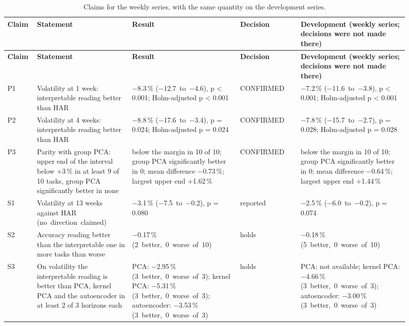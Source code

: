 {\scriptsize\setlength{\tabcolsep}{4pt}\renewcommand{\arraystretch}{1.2}
\begin{longtable}{@{}>{\raggedright\arraybackslash}p{0.069\linewidth}>{\raggedright\arraybackslash}p{0.226\linewidth}>{\raggedright\arraybackslash}p{0.254\linewidth}>{\raggedright\arraybackslash}p{0.141\linewidth}>{\raggedright\arraybackslash}p{0.254\linewidth}@{}}
\caption{Claims for the weekly series, with the same quantity on the development series.}\label{tab:C1}\\
\toprule
\textbf{Claim} & \textbf{Statement} & \textbf{Result} & \textbf{Decision} & \textbf{Development (weekly series; decisions were not made there)} \\
\midrule
\endfirsthead
\toprule
\textbf{Claim} & \textbf{Statement} & \textbf{Result} & \textbf{Decision} & \textbf{Development (weekly series; decisions were not made there)} \\
\midrule
\endhead
\bottomrule
\endlastfoot
P1 & Volatility at 1 week: interpretable reading better than HAR & \ensuremath{-}8.3\,\% (\ensuremath{-}12.7~to~\ensuremath{-}4.6), p < 0.001; Holm-adjusted p < 0.001 & CONFIRMED & \ensuremath{-}7.2\,\% (\ensuremath{-}11.6~to~\ensuremath{-}3.8), p < 0.001; Holm-adjusted p < 0.001 \\
P2 & Volatility at 4 weeks: interpretable reading better than HAR & \ensuremath{-}8.8\,\% (\ensuremath{-}17.6~to~\ensuremath{-}3.4), p = 0.024; Holm-adjusted p = 0.024 & CONFIRMED & \ensuremath{-}7.8\,\% (\ensuremath{-}15.7~to~\ensuremath{-}2.7), p = 0.028; Holm-adjusted p = 0.028 \\
P3 & Parity with group PCA: upper end of the interval below +3\,\% in at least 9 of 10 tasks, group PCA significantly better in none & below the margin in 10 of 10; group PCA significantly better in 0; mean difference \ensuremath{-}0.73\,\%; largest upper end +1.62\,\% & CONFIRMED & below the margin in 10 of 10; group PCA significantly better in 0; mean difference \ensuremath{-}0.64\,\%; largest upper end +1.44\,\% \\
S1 & Volatility at 13 weeks against HAR (no~direction~claimed) & \ensuremath{-}3.1\,\% (\ensuremath{-}7.5~to~\ensuremath{-}0.2), p = 0.080 & reported & \ensuremath{-}2.5\,\% (\ensuremath{-}6.0~to~\ensuremath{-}0.2), p = 0.074 \\
S2 & Accuracy reading better than the interpretable one in more tasks than worse & \ensuremath{-}0.17\,\% (2~better,~0~worse~of~10) & holds & \ensuremath{-}0.18\,\% (5~better,~0~worse~of~10) \\
S3 & On volatility the interpretable reading is better than PCA, kernel PCA and the autoencoder in at least 2 of 3 horizons each & PCA: \ensuremath{-}2.95\,\% (3~better,~0~worse~of~3); kernel PCA: \ensuremath{-}5.31\,\% (3~better,~0~worse~of~3); autoencoder: \ensuremath{-}3.53\,\% (3~better,~0~worse~of~3) & holds & PCA: not available; kernel PCA: \ensuremath{-}4.66\,\% (3~better,~0~worse~of~3); autoencoder: \ensuremath{-}3.00\,\% (3~better,~0~worse~of~3) \\

\end{longtable}}
